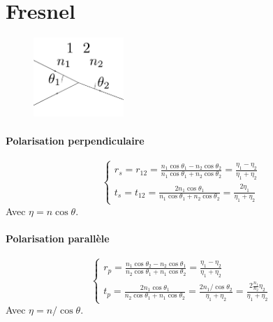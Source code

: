 \documentclass[a4paper,english]{article}
\begin{document}
\section{Fresnel}


\begin{figure}[H]
	\centering
	\includegraphics[height=3cm]{fresnel.pdf}
\end{figure}

\paragraph{Polarisation perpendiculaire}
\begin{equation}
\left\{ \begin{array}{l} 
r_s = r_{12} = \frac{n_1 \cos \theta_1 - n_2 \cos \theta_2}{n_1 \cos \theta_1 + n_2 \cos \theta_2} = \frac{\eta_1 - \eta_2}{\eta_1 + \eta_2} \\
t_s = t_{12} = \frac{2 n_1 \cos \theta_1}{n_1 \cos \theta_1 + n_2 \cos \theta_2} = \frac{2 \eta_1}{\eta_1 + \eta_2}
\end{array} \right.
\end{equation}
Avec $\eta = n \cos \theta$.

\paragraph{Polarisation parallèle}
\begin{equation}
\left\{ \begin{array}{l} 
r_p = \frac{n_1 \cos \theta_2 - n_2 \cos \theta_1}{n_2 \cos \theta_1 + n_1 \cos \theta_2} = \frac{\eta_1 - \eta_2}{\eta_1 + \eta_2} \\
t_p = \frac{2 n_1 \cos \theta_1}{n_2 \cos \theta_1 + n_1 \cos \theta_2} = \frac{2 n_1 / \cos \theta_2}{\eta_1 + \eta_2} = \frac{2 \frac{n_1}{n_2} \eta_2}{\eta_1 + \eta_2}
\end{array} \right.
\end{equation}
Avec $\eta = n / \cos \theta$.
\end{document}
